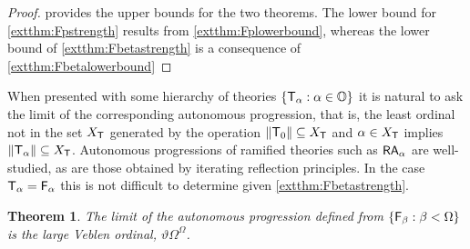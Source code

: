 \documentclass[UKenglish,cleveref,DIV=12]{scrartcl}
\let\forall\forallAlt
\newtheorem{theorem}{Theorem}
\theoremstyle{definition}
\theoremstyle{definition}
\begin{document}
\begin{proof}  provides the upper bounds for the two
theorems. The lower bound for \cref{extthm:Fpstrength} results from
\cref{extthm:Fplowerbound}, whereas the lower bound of
\cref{extthm:Fbetastrength} is a consequence of \cref{extthm:Fbetalowerbound}
\end{proof}
When presented with some hierarchy of theories $\{\mathsf{T}_\alpha:\alpha\in\mathbb{O}\}$ it is natural to ask the limit of the corresponding
autonomous progression, that is, the least ordinal not in the set $X_{\mathsf{T}}$ generated by the operation $\lVert{\mathsf{T}_0}\rVert\subseteq X_{\mathsf{T}}$ and
$\alpha\in X_{\mathsf{T}}$ implies $\lVert{\mathsf{T}_\alpha}\rVert\subseteq X_{\mathsf{T}}$. Autonomous progressions of ramified theories such as $\mathsf{RA}_\alpha$ are well-studied, as are those obtained by
iterating reflection principles.
In the case $\mathsf{T}_\alpha=\mathsf{F}_\alpha$ this is not difficult to determine
given \cref{extthm:Fbetastrength}.
\begin{theorem}\label{extthm:Fbauto}
 The limit of the autonomous progression defined from $\{\mathsf{F}_\beta:\beta<\Omega\}$ is the large Veblen ordinal, $\vartheta\Omega^\Omega$.
\end{theorem}
\end{document}
